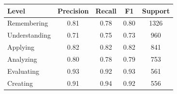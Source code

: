 \begin{tabular}{lcccc}
\hline
Level & Precision & Recall & F1 & Support \\
\hline
Remembering & 0.81 & 0.78 & 0.80 & 1326 \\
Understanding & 0.71 & 0.75 & 0.73 & 960 \\
Applying & 0.82 & 0.82 & 0.82 & 841 \\
Analyzing & 0.80 & 0.78 & 0.79 & 753 \\
Evaluating & 0.93 & 0.92 & 0.93 & 561 \\
Creating & 0.91 & 0.94 & 0.92 & 556 \\
\hline
\end{tabular}